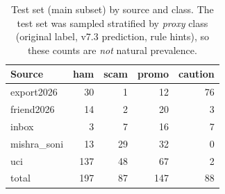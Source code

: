 \begin{table}[t]
\centering
\caption{Test set (main subset) by source and class. The test set was sampled stratified by \emph{proxy} class (original label, v7.3 prediction, rule hints), so these counts are \emph{not} natural prevalence.}
\label{tab:comp_test}
\small
\begin{tabular}{lrrrr}
\toprule
Source & ham & scam & promo & caution \\
\midrule
export2026 & 30 & 1 & 12 & 76 \\
friend2026 & 14 & 2 & 20 & 3 \\
inbox & 3 & 7 & 16 & 7 \\
mishra_soni & 13 & 29 & 32 & 0 \\
uci & 137 & 48 & 67 & 2 \\
total & 197 & 87 & 147 & 88 \\
\bottomrule
\end{tabular}
\end{table}
